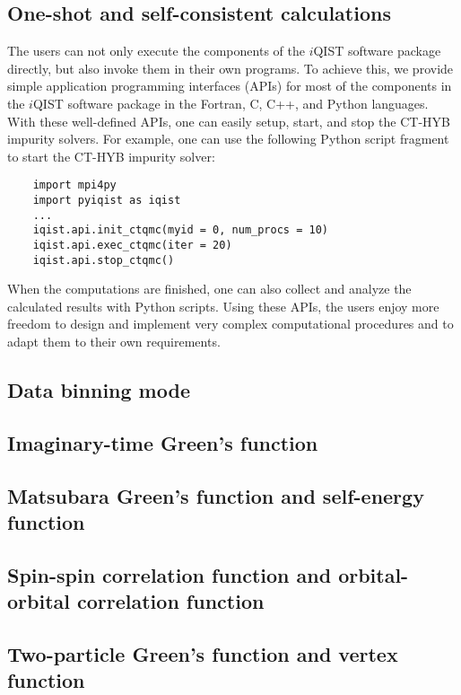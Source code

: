 \subsection{One-shot and self-consistent calculations}
The users can not only execute the components of the $i$QIST software package directly, but also invoke them in their own programs. To achieve this, we provide simple application programming interfaces (APIs) for most of the components in the $i$QIST software package in the Fortran, C, C++, and Python languages. With these well-defined APIs, one can easily setup, start, and stop the CT-HYB impurity solvers. For example, one can use the following Python script fragment to start the CT-HYB impurity solver:
\begin{verbatim}
    import mpi4py
    import pyiqist as iqist
    ...
    iqist.api.init_ctqmc(myid = 0, num_procs = 10)
    iqist.api.exec_ctqmc(iter = 20)
    iqist.api.stop_ctqmc()
\end{verbatim}
When the computations are finished, one can also collect and analyze the calculated results with Python scripts. Using these APIs, the users enjoy more freedom to design and implement very complex computational procedures and to adapt them to their own requirements.
\subsection{Data binning mode}
\subsection{Imaginary-time Green's function}
\subsection{Matsubara Green's function and self-energy function}
\subsection{Spin-spin correlation function and orbital-orbital correlation function}
\subsection{Two-particle Green's function and vertex function}

